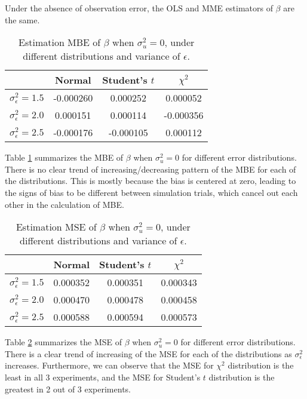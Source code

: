 \documentclass{article}
\begin{document}
Under the absence of observation error, the OLS and MME estimators of $\beta$ are the same.

\begin{table}[ht]
    \centering
    \caption{Estimation MBE of $\beta$ when $\sigma^2_u=0$, under different distributions and variance of $\epsilon$.}
    \label{Tab:MBE_absence}
    \begin{tabular}[t]{lccc}
        \hline
        &Normal&Student's $t$&$\chi^2$\\
        \hline
        $\sigma^2_\epsilon = 1.5$&-0.000260& 0.000252& 0.000052\\
        $\sigma^2_\epsilon = 2.0$& 0.000151& 0.000114&-0.000356\\
        $\sigma^2_\epsilon = 2.5$&-0.000176&-0.000105& 0.000112\\
        \hline
    \end{tabular}
\end{table}

Table \ref{Tab:MBE_absence} summarizes the MBE of $\beta$ when $\sigma^2_u=0$ for different error distributions.
There is no clear trend of increasing/decreasing pattern of the MBE for each of the distributions. 
This is mostly because the bias is centered at zero, leading to the signs of bias to be different between simulation trials, which cancel out each other in the calculation of MBE. 

\begin{table}[ht]
    \centering
    \caption{Estimation MSE of $\beta$ when $\sigma^2_u=0$, under different distributions and variance of $\epsilon$.}
    \label{Tab:MSE_absence}
    \begin{tabular}[t]{lccc}
        \hline
        &Normal&Student's $t$&$\chi^2$\\
        \hline
        $\sigma^2_\epsilon = 1.5$&0.000352&0.000351&0.000343\\
        $\sigma^2_\epsilon = 2.0$&0.000470&0.000478&0.000458\\
        $\sigma^2_\epsilon = 2.5$&0.000588&0.000594&0.000573\\
        \hline
    \end{tabular}
\end{table}

Table \ref{Tab:MSE_absence} summarizes the MSE of $\beta$ when $\sigma^2_u=0$ for different error distributions.
There is a clear trend of increasing of the MSE for each of the distributions as $\sigma^2_\epsilon$ increases. 
Furthermore, we can observe that the MSE for $\chi^2$ distribution is the least in all 3 experiments, and the MSE for Student's $t$ distribution is the greatest in 2 out of 3 experiments.
\end{document}
